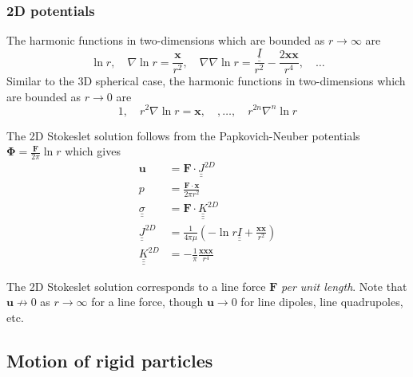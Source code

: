 \documentclass{jknotes}
\newcommand{\dunder}[1]{\underline{\underline{#1}}}
\newcommand{\x}{\bm{x}}
\begin{document}
\subsubsection{2D potentials}
The harmonic functions in two-dimensions which are bounded as $r \to \infty$
are
\begin{equation}
	\ln r, \hspace{1em} \nabla \ln r = \frac{\x}{r^2}, \hspace{1em} \nabla
	\nabla \ln r = \frac{\dunder{I}}{r^2} - \frac{2\x\x}{r^4}, \hspace{1em}\dots
\end{equation}
Similar to the 3D spherical case, the harmonic functions in two-dimensions
which are bounded as $r \to 0$ are
\begin{equation}
	1, \hspace{1em} r^2\nabla \ln r = \x, \hspace{1em}, \dots, \hspace{1em}
	r^{2n} \nabla^n \ln r
\end{equation}

The 2D Stokeslet solution follows from the Papkovich-Neuber potentials
$\bm{\Phi} = \frac{\bm{F}}{2\pi} \ln r$ which gives
\begin{align}
	\bm{u} &= \bm{F}\cdot\dunder{J}^{2D} \\
	p &= \frac{\bm{F}\cdot\x}{2\pi r^2} \\
	\dunder{\sigma} &= \bm{F} \cdot \dunder{\underline{K}}^{2D} \\
	\dunder{J}^{2D} &= \frac{1}{4\pi \mu} \left( -\ln r \dunder{I} +
	\frac{\x\x}{r^2}\right) \\
	\dunder{\underline{K}}^{2D} &= -\frac{1}{\pi} \frac{\x\x\x}{r^4}
\end{align}

The 2D Stokeslet solution corresponds to a line force $\bm{F}$ \emph{per unit
length}. Note that $\bm{u} \not\to 0$ as $r \to \infty$ for a line force,
though $\bm{u} \to 0$ for line dipoles, line quadrupoles, etc.

\subsection{Motion of rigid particles}
\end{document}
